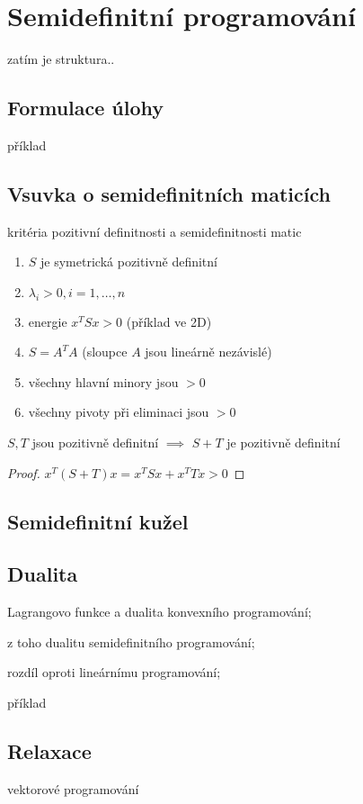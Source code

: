 \chapter{Semidefinitní programování}

zatím je struktura.. 

\section{Formulace úlohy}
\noindent příklad

\section{Vsuvka o semidefinitních maticích}

kritéria pozitivní definitnosti a semidefinitnosti matic

\begin{enumerate}
    \item $S$ je symetrická pozitivně definitní
    \item $\lambda_i > 0, i=1, \dots, n$
    \item energie $x^TSx > 0$ (příklad ve 2D)
    \item $S = A^TA$ (sloupce $A$ jsou lineárně nezávislé)
    \item všechny hlavní minory jsou $> 0$
    \item všechny pivoty při eliminaci jsou $> 0$
\end{enumerate}


\begin{vt}
$S, T$ jsou pozitivně definitní $\implies$ $S + T$ je pozitivně definitní
\end{vt}

\begin{proof}
$x^T (S+T) x = x^T S x + x^T T x > 0$
\end{proof}


\section{Semidefinitní kužel}



\section{Dualita}
\noindent Lagrangovo funkce a dualita konvexního programování;

\noindent z toho dualitu semidefinitního programování;

\noindent rozdíl oproti lineárnímu programování;

\noindent příklad

\section{Relaxace}
\noindent vektorové programování


